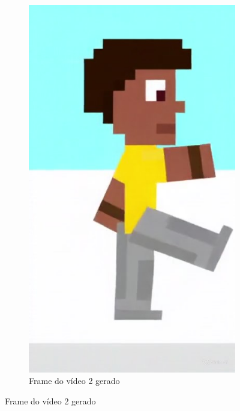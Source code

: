 \begin{figure}[htbp]
\begin{subfigure}{0.2
    \linewidth}
        \includegraphics[width=1\linewidth]{figs/vidu/frame4.2.jpg}
        \caption{\small Frame do vídeo 2 gerado}
        \label{fig:vidu2c}
    \end{subfigure}

\end{figure}

